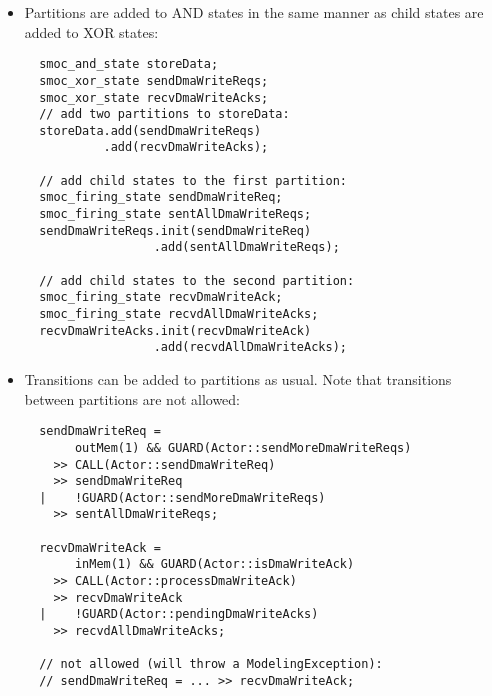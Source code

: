 \begin{frame}[fragile=singleslide]
\begin{itemize}
\item Partitions are added to AND states in the same manner as child states are added to XOR states:
\begin{lstlisting}
  smoc_and_state storeData;
  smoc_xor_state sendDmaWriteReqs;
  smoc_xor_state recvDmaWriteAcks;
  // add two partitions to storeData:
  storeData.add(sendDmaWriteReqs)
           .add(recvDmaWriteAcks);

  // add child states to the first partition:
  smoc_firing_state sendDmaWriteReq; 
  smoc_firing_state sentAllDmaWriteReqs; 
  sendDmaWriteReqs.init(sendDmaWriteReq)
                  .add(sentAllDmaWriteReqs);

  // add child states to the second partition:
  smoc_firing_state recvDmaWriteAck; 
  smoc_firing_state recvdAllDmaWriteAcks; 
  recvDmaWriteAcks.init(recvDmaWriteAck)
                  .add(recvdAllDmaWriteAcks);
\end{lstlisting}
\end{itemize}
\end{frame}

\begin{frame}[fragile=singleslide]
\begin{itemize}
\item Transitions can be added to partitions as usual. Note that transitions between partitions are not allowed:
\begin{lstlisting}
  sendDmaWriteReq =
       outMem(1) && GUARD(Actor::sendMoreDmaWriteReqs)
    >> CALL(Actor::sendDmaWriteReq)
    >> sendDmaWriteReq
  |    !GUARD(Actor::sendMoreDmaWriteReqs)
    >> sentAllDmaWriteReqs;
  
  recvDmaWriteAck =
       inMem(1) && GUARD(Actor::isDmaWriteAck)
    >> CALL(Actor::processDmaWriteAck)
    >> recvDmaWriteAck
  |    !GUARD(Actor::pendingDmaWriteAcks)
    >> recvdAllDmaWriteAcks;

  // not allowed (will throw a ModelingException):
  // sendDmaWriteReq = ... >> recvDmaWriteAck;
\end{lstlisting}
\end{itemize}
\end{frame}

